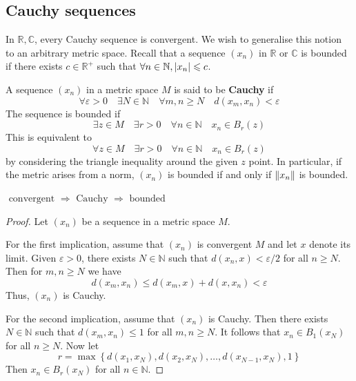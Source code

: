 \documentclass[a4paper]{article}
\begin{document}
\subsection{Cauchy sequences}
In \( \mathbb R, \mathbb C \), every Cauchy sequence is convergent.
We wish to generalise this notion to an arbitrary metric space.
Recall that a sequence \( (x_n) \) in \( \mathbb R \) or \( \mathbb C \) is bounded if there exists \( c \in \mathbb R^+ \) such that \( \forall n \in \mathbb N, \abs{x_n} \leqslant c \).
\begin{definition}
	A sequence \( (x_n) \) in a metric space \( M \) is said to be \textbf{Cauchy} if
	\[
		\forall \varepsilon > 0\quad \exists N \in \mathbb N\quad \forall m,n \geq N\quad d(x_m,x_n) < \varepsilon
	\]
	The sequence is bounded if
	\[
		\exists z \in M\quad \exists r > 0\quad \forall n \in \mathbb N\quad x_n \in B_r(z)
	\]
	This is equivalent to
	\[
		\forall z \in M\quad \exists r > 0\quad \forall n \in \mathbb N\quad x_n \in B_r(z)
	\]
	by considering the triangle inequality around the given \( z \) point.
	In particular, if the metric arises from a norm, \( (x_n) \) is bounded if and only if \( \norm{x_n} \) is bounded.
\end{definition}
\begin{lemma}
	$ \text { convergent } \Longrightarrow \text { Cauchy } \Longrightarrow \text { bounded } $
\end{lemma}

\begin{proof}
    Let $\left(x_n\right)$ be a sequence in a metric space $M$.

    For the first implication, assume that $\left(x_n\right)$ is convergent $M$ and let $x$ denote its limit. Given $\varepsilon>0$, there exists $N \in \mathbb{N}$ such that $d\left(x_n, x\right)<\varepsilon / 2$ for all $n \geqslant N$. Then for $m, n \geqslant N$ we have
    \[
    d\left(x_m, x_n\right) \leqslant d\left(x_m, x\right)+d\left(x, x_n\right)<\varepsilon
    \]
    Thus, $\left(x_n\right)$ is Cauchy.

    For the second implication, assume that $\left(x_n\right)$ is Cauchy. Then there exists $N \in \mathbb{N}$ such that $d\left(x_m, x_n\right) \leqslant 1$ for all $m, n \geqslant N$. It follows that $x_n \in B_1\left(x_N\right)$ for all $n \geqslant N$. Now let
    \[
    r=\max \left\{d\left(x_1, x_N\right), d\left(x_2, x_N\right), \ldots, d\left(x_{N-1}, x_N\right), 1\right\}
    \]
    Then $x_n \in B_r\left(x_N\right)$ for all $n \in \mathbb{N}$.
\end{proof}
\end{document}
